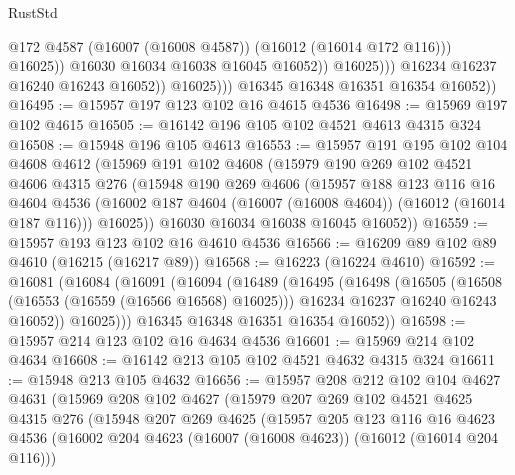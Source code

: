 \begin{lexlean}{RustStd}
\begin{coremodule}
                                  @172
                                  @4587
                                  (@16007 (@16008 @4587))
                                  (@16012 (@16014 @172 @116)))
                                @16025))
                            @16030
                            @16034
                            @16038
                            @16045
                            @16052))
                        @16025)))
                  @16234
                  @16237
                  @16240
                  @16243
                  @16052))
              @16025)))
        @16345
        @16348
        @16351
        @16354
        @16052))
@16495 := @15957 @197 @123 @102 @16 @4615 @4536
@16498 := @15969 @197 @102 @4615
@16505 := @16142 @196 @105 @102 @4521 @4613 @4315 @324
@16508 := @15948 @196 @105 @4613
@16553 := @15957
    @191
    @195
    @102
    @104
    @4608
    @4612
    (@15969
      @191
      @102
      @4608
      (@15979
        @190
        @269
        @102
        @4521
        @4606
        @4315
        @276
        (@15948
          @190
          @269
          @4606
          (@15957
            @188
            @123
            @116
            @16
            @4604
            @4536
            (@16002 @187 @4604 (@16007 (@16008 @4604)) (@16012 (@16014 @187 @116)))
            @16025))
        @16030
        @16034
        @16038
        @16045
        @16052))
@16559 := @15957 @193 @123 @102 @16 @4610 @4536
@16566 := @16209 @89 @102 @89 @4610 (@16215 (@16217 @89))
@16568 := @16223 (@16224 @4610)
@16592 := @16081
    (@16084
      (@16091
        (@16094
          (@16489
            (@16495
              (@16498
                (@16505
                  (@16508 (@16553 (@16559 (@16566 @16568) @16025)))
                  @16234
                  @16237
                  @16240
                  @16243
                  @16052))
              @16025)))
        @16345
        @16348
        @16351
        @16354
        @16052))
@16598 := @15957 @214 @123 @102 @16 @4634 @4536
@16601 := @15969 @214 @102 @4634
@16608 := @16142 @213 @105 @102 @4521 @4632 @4315 @324
@16611 := @15948 @213 @105 @4632
@16656 := @15957
    @208
    @212
    @102
    @104
    @4627
    @4631
    (@15969
      @208
      @102
      @4627
      (@15979
        @207
        @269
        @102
        @4521
        @4625
        @4315
        @276
        (@15948
          @207
          @269
          @4625
          (@15957
            @205
            @123
            @116
            @16
            @4623
            @4536
            (@16002 @204 @4623 (@16007 (@16008 @4623)) (@16012 (@16014 @204 @116)))

\end{coremodule}
\end{lexlean}
